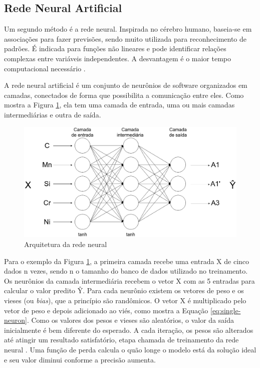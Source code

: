 \documentclass[brazil,tf,epusp]{usp}  %
\begin{document}
\subsection{Rede Neural Artificial}
Um segundo método é a rede neural. Inspirada no cérebro humano, baseia-se em associações para fazer previsões, sendo muito utilizada para reconhecimento de padrões. É indicada para funções não lineares e pode identificar relações complexas entre variáveis independentes. A desvantagem é o maior tempo computacional necessário \cite{Belisle2015}.

A rede neural artificial é um conjunto de neurônios de software organizados em camadas, conectados de forma que possibilita a comunicação entre eles. Como mostra a Figura \ref{fig:rede-neural-arquitetura}, ela tem uma camada de entrada, uma ou mais camadas intermediárias e outra de saída.

\begin{figure}[ht!]
  \includegraphics[width=.9\textwidth]{img/neural-network.png}
  \caption{Arquitetura da rede neural}
  \label{fig:rede-neural-arquitetura}
\end{figure}

Para o exemplo da Figura \ref{fig:rede-neural-arquitetura}, a primeira camada recebe uma entrada X de cinco dados n vezes, sendo n o tamanho do banco de dados utilizado no treinamento. Os neurônios da camada intermediária recebem o vetor X com as 5 entradas para calcular o valor predito Ŷ. Para cada neurônio existem os vetores de peso e os vieses (ou \textit{bias}), que a princípio são randômicos. O vetor X é multiplicado pelo vetor de peso e depois adicionado ao viés, como mostra a Equação \ref{eq:single-neuron}. Como os valores dos pesos e vieses são aleatórios, o valor da saída inicialmente é bem diferente do esperado. A cada iteração, os pesos são alterados até atingir um resultado satisfatório, etapa chamada de treinamento da rede neural \cite{Bhadeshia1999}. Uma função de perda calcula o quão longe o modelo está da solução ideal e seu valor diminui conforme a precisão aumenta.
\end{document}
